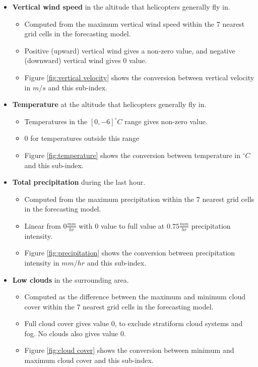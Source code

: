 \begin{itemize}
    \item \textbf{Vertical wind speed} in the altitude that helicopters generally fly in.
    \begin{itemize}
        \item Computed from the maximum vertical wind speed within the 7 nearest grid cells in the forecasting model.
        \item Positive (upward) vertical wind gives a non-zero value, and negative (downward) vertical wind gives 0 value.
        \item Figure \ref{fig:vertical velocity} shows the conversion between vertical velocity in $m/s$ and this sub-index.
    \end{itemize}
    \item \textbf{Temperature} at the altitude that helicopters generally fly in.
    \begin{itemize}
        \item Temperatures in the $[0,-6] ^{\circ}C$ range gives non-zero value. 
        \item 0 for temperatures outside this range
        \item Figure \ref{fig:temperature} shows the conversion between temperature in $^{\circ}C$ and this sub-index.
    \end{itemize}
    \item \textbf{Total precipitation} during the last hour.
    \begin{itemize}
        \item Computed from the maximum precipitation within the 7 nearest grid cells in the forecasting model.
        \item Linear from $0\frac{mm}{hr}$ with 0 value to full value at $0.75\frac{mm}{hr}$ precipitation intensity.
        \item Figure \ref{fig:precipitation} shows the conversion between precipitation intensity in $mm/hr$ and this sub-index.
    \end{itemize}
    \item \textbf{Low clouds} in the surrounding area.
    \begin{itemize}
        \item Computed as the difference between the maximum and minimum cloud cover within the 7 nearest grid cells in the forecasting model. 
        \item Full cloud cover gives value 0, to exclude stratiform cloud systems and fog. No clouds also gives value 0. 
        \item Figure \ref{fig:cloud cover} shows the conversion between minimum and maximum cloud cover and this sub-index.
    \end{itemize} 
\end{itemize}

